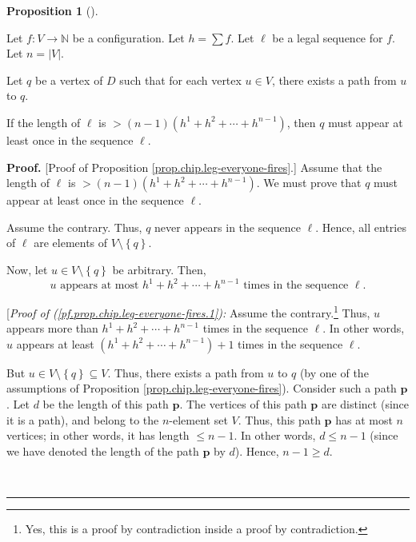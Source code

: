 \documentclass[numbers=enddot,12pt,final,onecolumn,notitlepage]{scrartcl}%
\theoremstyle{definition}
\newtheorem{prop}[theo]{Proposition}
\newenvironment{proposition}[1][]
{\begin{prop}[#1]\begin{leftbar}}
{\end{leftbar}\end{prop}}
\newenvironment{proof}[1][Proof]{\noindent\textbf{#1.} }{\ \rule{0.5em}{0.5em}}
\let\sumnonlimits\sum
\renewcommand{\sum}{\sumnonlimits\limits}
\newcommand{\NN}{\mathbb{N}}
\newcommand{\abs}[1]{\left| #1 \right|}
\newcommand{\tup}[1]{\left( #1 \right)}
\begin{document}
\begin{proposition} \label{prop.chip.leg-everyone-fires}
Let $f : V \to \NN$ be a configuration.
Let $h = \sum f$.
Let $\ell$ be a legal sequence for $f$.
Let $n = \abs{V}$.

Let $q$ be a vertex of $D$ such that for each vertex
$u \in V$, there exists a path from $u$ to $q$.

If the length of $\ell$ is
$> \tup{n-1} \tup{ h^1 + h^2 + \cdots + h^{n-1} }$,
then $q$ must appear at least once in the sequence $\ell$.
\end{proposition}

\begin{proof}
[Proof of Proposition \ref{prop.chip.leg-everyone-fires}.] Assume that the
length of $\ell$ is $>\left(  n-1\right)  \left(  h^{1}+h^{2}+\cdots
+h^{n-1}\right)  $. We must prove that $q$ must appear at least once in the
sequence $\ell$.

Assume the contrary. Thus, $q$ never appears in the sequence $\ell$. Hence,
all entries of $\ell$ are elements of $V\setminus\left\{  q\right\}  $.

Now, let $u\in V\setminus\left\{  q\right\}  $ be arbitrary. Then,%
\begin{equation}
u\text{ appears at most }h^{1}+h^{2}+\cdots+h^{n-1}\text{ times in the
sequence }\ell.\label{pf.prop.chip.leg-everyone-fires.1}%
\end{equation}


[\textit{Proof of (\ref{pf.prop.chip.leg-everyone-fires.1}):} Assume the
contrary.\footnote{Yes, this is a proof by contradiction inside a proof by
contradiction.} Thus, $u$ appears more than $h^{1}+h^{2}+\cdots+h^{n-1}$ times
in the sequence $\ell$. In other words, $u$ appears at least $\left(
h^{1}+h^{2}+\cdots+h^{n-1}\right)  +1$ times in the sequence $\ell$.

But $u\in V\setminus\left\{  q\right\}  \subseteq V$. Thus, there exists a
path from $u$ to $q$ (by one of the assumptions of Proposition
\ref{prop.chip.leg-everyone-fires}). Consider such a path $\mathbf{p}$. Let
$d$ be the length of this path $\mathbf{p}$. The vertices of this path
$\mathbf{p}$ are distinct (since it is a path), and belong to the $n$-element
set $V$. Thus, this path $\mathbf{p}$ has at most $n$ vertices; in other
words, it has length $\leq n-1$. In other words, $d\leq n-1$ (since we have
denoted the length of the path $\mathbf{p}$ by $d$). Hence, $n-1\geq d$.


\end{proof}
\end{document}
